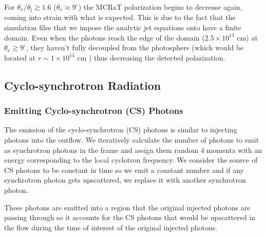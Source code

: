 \documentclass[12pt,a4paper]{article}
\begin{document}
For $\theta_{\mathrm{v}}/\theta_{\mathrm{j}} \gtrsim 1.6$ ($\theta_{\mathrm{v}} \approx 9^\circ$) the MCRaT polarization begins to decrease again, coming into strain with what is expected. This is due to the fact that the simulation files that we impose the analytic jet equations onto have a finite domain. Even when the photons reach the edge of the domain ($2.5 \times 10^{13}$ cm) at $\theta_{\mathrm{v}} \gtrsim 9^\circ$, they haven't fully decoupled from the photosphere (which would be located at $r\sim 1\times 10^{14}$ cm \citep{lundman2014polarization}) thus decreasing the detected polarization. 

\subsection{Cyclo-synchrotron Radiation}\label{synch}
\subsubsection{Emitting Cyclo-synchrotron (CS) Photons}
The emission of the cyclo-synchrotron (CS) photons is similar to injecting photons into the outflow. We iteratively calculate the number of photons to emit as synchrotron photons in the frame and assign them random 4 momenta with an energy corresponding to the local cyclotron frequency. We consider the source of CS photons to be constant in time so we emit a constant number and if any synchrotron photon gets upscattered, we replace it with another synchrotron photon. 

These photons are emitted into a region that the original injected photons are passing through so it accounts for the CS photons that would be upscattered in the flow during the time of interest of the original injected photons.
\end{document}
